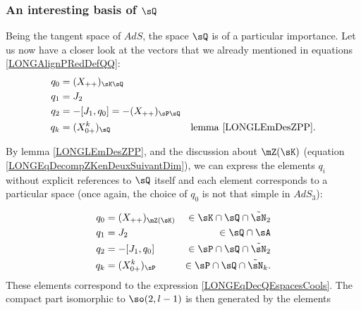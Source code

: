 %
\subsubsection{An interesting basis of \texorpdfstring{$\sQ$}{Q}}
%
\label{LONGSubSubSecInterestingBasisQ}

Being the tangent space of $AdS$, the space $\sQ$ is of a particular importance. Let us now have a closer look at the vectors that we already mentioned in equations \eqref{LONGAlignPRedDefQQ}:
\begin{subequations}				\label{LONGEqBasQQzi}
	\begin{align}
		q_0&=(X_{++})_{\sK\sQ}\\
		q_1&=J_2\\
		q_2&=-[J_1,q_0]=-(X_{++})_{\sP\sQ}\\
		q_k&=(X^k_{0+})_{\sQ}		&\text{lemma \ref{LONGLEmDesZPP}}.
	\end{align}
\end{subequations}

By lemma \ref{LONGLEmDesZPP}, and the discussion about $\mZ(\sK)$ (equation \eqref{LONGEqDecompZKenDeuxSuivantDim}), we can express the elements $q_i$ without explicit references to $\sQ$ itself and each element corresponds to a particular space (once again, the choice of $q_0$ is not that simple in $AdS_3$):

%
\begin{subequations}		\label{LONGEqBasQQziPlusMieux}%
	\begin{align}
		q_0&=(X_{++})_{\mZ(\sK)}&\in \sK\cap\sQ\cap\tilde\sN_2					\\
		q_1&=J_2&\in\sQ\cap\sA\\							
		q_2&=-[J_1,q_0]	&\in\sP\cap\sQ\cap\tilde\sN_2	\label{LONGsubEqJUnQZQDeux}		\\
		q_k&=(X^k_{0+})_{\sP}&\in\sP\cap\sQ\cap\tilde\sN_k.
	\end{align}
\end{subequations}
These elements correspond to the expression \eqref{LONGEqDecQEspacesCools}.
%
The compact part isomorphic to $\so(2,l-1)$ is then generated by the elements%

